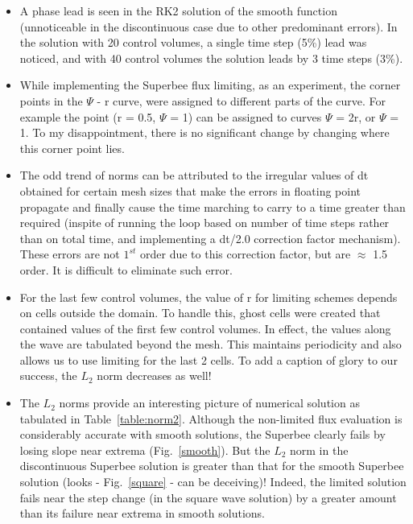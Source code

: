 \documentclass[a4paper,10pt]{article}
\begin{document}
\begin{itemize}
\item A phase lead is seen in the RK2 solution of the smooth function (unnoticeable in the discontinuous case due to other predominant errors). In the solution with 20 control volumes, a single time step (5\%) lead was noticed, and with 40 control volumes the solution leads by 3 time steps (3\%). 

\item  While implementing the Superbee flux limiting, as an experiment, the corner points in the $\Psi$ - r curve, were assigned to different parts of the curve. For example the point (r = 0.5, $\Psi$ = 1) can be assigned to curves $\Psi$ = 2r, or $\Psi$ = 1. To my disappointment, there is no significant change by changing where this corner point lies.

\item The odd trend of norms can be attributed to the irregular values of dt obtained for certain mesh sizes that make the errors in floating point propagate and finally cause the time marching to carry to a time greater than required (inspite of running the loop based on number of time steps rather than on total time, and implementing a dt/2.0 correction factor mechanism). These errors are not $1^{st}$ order due to this correction factor, but are $\approx$ 1.5 order. It is difficult to eliminate such error.
  
\item For the last few control volumes, the value of r for limiting schemes depends on cells outside the domain. To handle this, ghost cells were created that contained values of the first few control volumes. In effect, the values along the wave are tabulated beyond the mesh. This  maintains periodicity and also allows us to use limiting for the last 2 cells. To add a caption of glory to our success, the $L_2$ norm decreases as well!

\item The $L_2$ norms provide an interesting picture of numerical solution as tabulated in Table~\ref{table:norm2}. Although the non-limited flux evaluation is considerably accurate with smooth solutions, the Superbee clearly fails by losing slope near extrema (Fig.~\ref{smooth}). But the $L_2$ norm in the discontinuous Superbee solution is greater than that for the smooth Superbee solution (looks - Fig.~\ref{square} - can be deceiving)! Indeed, the limited solution fails near the step change (in the square wave solution) by a greater amount than its failure near extrema in smooth solutions.


\end{itemize}
\end{document}
